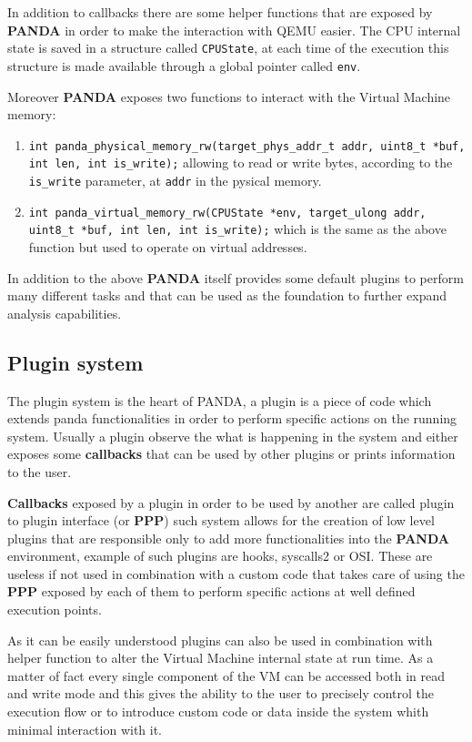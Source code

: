In addition to callbacks there are some helper functions that are exposed by \textbf{PANDA} in order to make the interaction with QEMU easier. The CPU internal state is saved in a structure called \lstinline{CPUState}, at each time of the execution this structure is made available through a global pointer called \lstinline{env}. 

Moreover \textbf{PANDA} exposes two functions to interact with the Virtual Machine memory: 
\begin{enumerate}
    \item \lstinline{int panda_physical_memory_rw(target_phys_addr_t addr, uint8_t *buf, int len, int is_write);} allowing to read or write bytes, according to the \lstinline{is_write} parameter, at \lstinline{addr} in the pysical memory.
    \item \lstinline{int panda_virtual_memory_rw(CPUState *env, target_ulong addr, uint8_t *buf, int len, int is_write);} which is the same as the above function but used to operate on virtual addresses.
\end{enumerate}


In addition to the above \textbf{PANDA} itself provides some default plugins to perform many different tasks and that can be used as the foundation to further expand analysis capabilities.


\subsection{Plugin system}

The plugin system is the heart of PANDA, a plugin is a piece of code which extends panda functionalities in order to perform specific actions on the running system. Usually a plugin observe the what is happening in the system and either exposes some \textbf{callbacks} that can be used by other plugins or prints information to the user.

\textbf{Callbacks} exposed by a plugin in order to be used by another are called plugin to plugin interface (or \textbf{PPP}) such system allows for the creation of low level plugins that are responsible only to add more functionalities into the \textbf{PANDA} environment, example of such plugins are hooks, syscalls2 or OSI. These are useless if not used in combination with a custom code that takes care of using the \textbf{PPP} exposed by each of them to perform specific actions at well defined execution points.

As it can be easily understood plugins can also be used in combination with helper function to alter the Virtual Machine internal state at run time. As a matter of fact every single component of the VM can be accessed both in read and write mode and this gives the ability to the user to precisely control the execution flow or to introduce custom code or data inside the system whith minimal interaction with it. 


